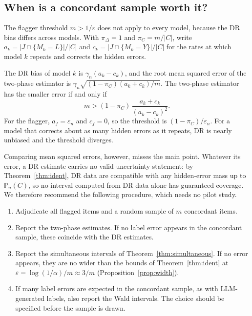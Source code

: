 \documentclass[twoside,11pt]{article}
\newcommand{\Pn}{\mathbb{P}_n}
\newcommand{\1}{\mathbf{1}}
\newcommand{\Dset}{\Delta}
\newcommand{\Cset}{C}
\begin{document}
\subsection{When is a concordant sample worth it?}
\label{sec:rule}

The flagger threshold $m>1/\varepsilon$ does not apply to every model, because the DR bias differs across models. With $\pi_\Dset=1$ and $\pi_\Cset=m/|\Cset|$, write $a_k=|J\cap\{M_k=L\}|/|\Cset|$ and $c_k=|J\cap\{M_k=Y\}|/|\Cset|$ for the rates at which model $k$ repeats and corrects the hidden errors.

\begin{proposition}\label{prop:rule}
The DR bias of model $k$ is $\gamma_n(a_k-c_k)$, and the root mean squared error of the two-phase estimator is $\gamma_n\sqrt{(1-\pi_\Cset)(a_k+c_k)/m}$. The two-phase estimator has the smaller error if and only if
\[
m>(1-\pi_\Cset)\,\frac{a_k+c_k}{(a_k-c_k)^2}.
\]
For the flagger, $a_f=\varepsilon_n$ and $c_f=0$, so the threshold is $(1-\pi_\Cset)/\varepsilon_n$. For a model that corrects about as many hidden errors as it repeats, DR is nearly unbiased and the threshold diverges.
\end{proposition}

Comparing mean squared errors, however, misses the main point. Whatever its error, a DR estimate carries no valid uncertainty statement: by Theorem~\ref{thm:ident}, DR data are compatible with any hidden-error mass up to $\Pn(\Cset)$, so no interval computed from DR data alone has guaranteed coverage. We therefore recommend the following procedure, which needs no pilot study.
\begin{enumerate}
\item Adjudicate all flagged items and a random sample of $m$ concordant items.
\item Report the two-phase estimates. If no label error appears in the concordant sample, these coincide with the DR estimates.
\item Report the simultaneous intervals of Theorem~\ref{thm:simultaneous}. If no error appears, they are no wider than the bounds of Theorem~\ref{thm:ident} at $\varepsilon=\log(1/\alpha)/m\approx3/m$ (Proposition~\ref{prop:width}).
\item If many label errors are expected in the concordant sample, as with LLM-generated labels, also report the Wald intervals. The choice should be specified before the sample is drawn.
\end{enumerate}
\end{document}
